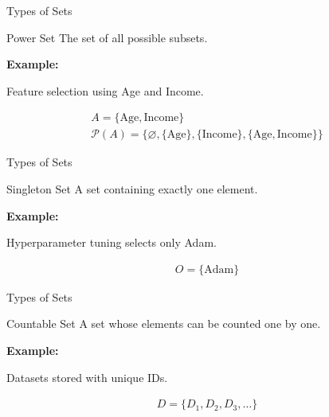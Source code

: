 \documentclass{beamer}
\begin{document}
\begin{frame}{Types of Sets}

\begin{block}{Power Set}
The set of all possible subsets.
\end{block}

\textbf{Example:}

Feature selection using Age and Income.

\begin{gather*}
A=\{\text{Age},\text{Income}\}\\
\mathcal{P}(A)=
\{
\varnothing,
\{\text{Age}\},
\{\text{Income}\},
\{\text{Age},\text{Income}\}
\}
\end{gather*}

\end{frame}

\begin{frame}{Types of Sets}

\begin{block}{Singleton Set}
A set containing exactly one element.
\end{block}

\textbf{Example:}

Hyperparameter tuning selects only Adam.

\begin{gather*}
O=\{\text{Adam}\}
\end{gather*}

\end{frame}

\begin{frame}{Types of Sets}

\begin{block}{Countable Set}
A set whose elements can be counted one by one.
\end{block}

\textbf{Example:}

Datasets stored with unique IDs.

\begin{gather*}
D=\{D_1,D_2,D_3,\ldots\}
\end{gather*}

\end{frame}
\end{document}

